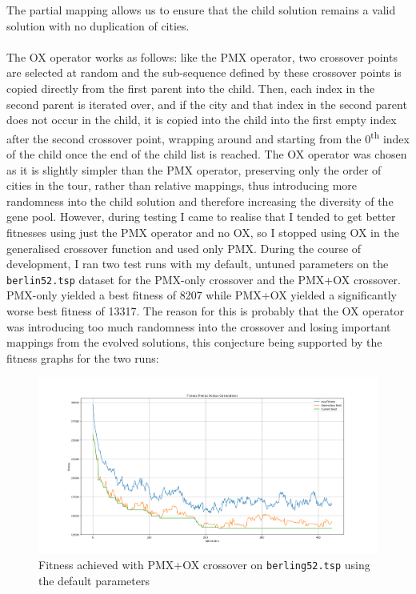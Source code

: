 \documentclass[a4paper]{article}
\begin{document}
The partial mapping allows us to ensure that the child solution remains a valid solution with no duplication of cities.
\\\\
The OX operator works as follows:
like the PMX operator, two crossover points are selected at random and the sub-sequence defined by these crossover points is copied directly from the first parent into the child.
Then, each index in the second parent is iterated over, and if the city and that index in the second parent does not occur in the child, it is copied into the child into the first empty index after the second crossover point, wrapping around and starting from the 0\textsuperscript{th} index of the child once the end of the child list is reached.
The OX operator was chosen as it is slightly simpler than the PMX operator, preserving only the order of cities in the tour, rather than relative mappings, thus introducing more randomness into the child solution and therefore increasing the diversity of the gene pool.
However, during testing I came to realise that I tended to get better fitnesses using just the PMX operator and no OX, so I stopped using OX in the generalised crossover function and used only PMX.
During the course of development, I ran two test runs with my default, untuned parameters on the \verb|berlin52.tsp| dataset for the PMX-only crossover and the PMX+OX crossover.
PMX-only yielded a best fitness of 8207 while PMX+OX yielded a significantly worse best fitness of 13317.
The reason for this is probably that the OX operator was introducing too much randomness into the crossover and losing important mappings from the evolved solutions, this conjecture being supported by the fitness graphs for the two runs:

\begin{figure}[H]
    \centering
    \includegraphics[width=\textwidth]{./images/berlin52_defaults_pmxox.png}
\caption{Fitness achieved with PMX+OX crossover on \texttt{berling52.tsp} using the default parameters}
\end{figure}
\end{document}
